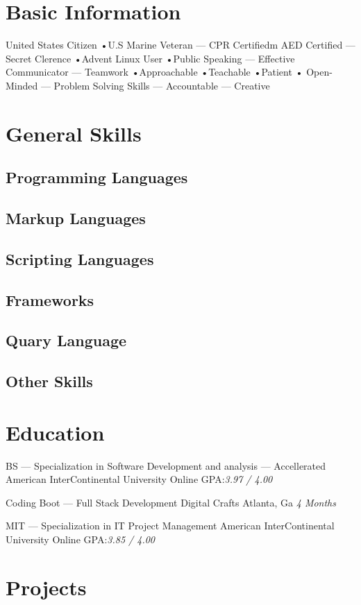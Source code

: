 \documentclass{resume-class/nadario_resume}
\begin{document}
\makecvtitle{}
\section{Basic Information}
United States Citizen •U.S Marine Veteran --- CPR Certifiedm AED Certified --- Secret
Clerence •Advent Linux User •Public Speaking --- Effective Communicator ---
Teamwork •Approachable •Teachable •Patient • Open-Minded --- Problem Solving Skills --- Accountable --- Creative

\section{General Skills}
\subsection{Programming Languages}
\subsection{Markup Languages}
\subsection{Scripting Languages}
\subsection{Frameworks}
\subsection{Quary Language}
\subsection{Other Skills}

\section{Education}
        {BS --- Specialization in Software Development and analysis --- Accellerated}
        {American InterContinental University}
        {Online}
        {}{GPA:\textit{3.97 / 4.00}}
        \vspace{.25cm}

        {Coding Boot --- Full Stack Development}
        {Digital Crafts}
        {Atlanta, Ga}
        {}{\textit{4 Months}}
        \vspace{.25cm}

        {MIT --- Specialization in IT Project Management}
        {American InterContinental University}
        {Online}
        {}{GPA:\textit{3.85 / 4.00}}
        \vspace{.25cm}

\section{Projects}
\end{document}

